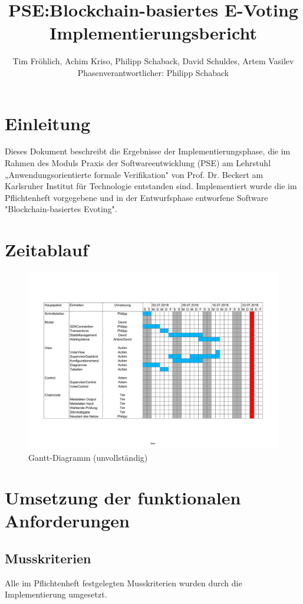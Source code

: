 \documentclass[parskip=full]{scrartcl}
\title{
	PSE:Blockchain-basiertes E-Voting \\
	Implementierungsbericht
}
\author{Tim Fröhlich, Achim Kriso, Philipp Schaback, David Schuldes, Artem Vasilev\\ Phasenverantwortlicher: Philipp Schaback}
\begin{document}
\clearpage
\maketitle
{}
\newpage

\tableofcontents
\newpage
{}

\section{Einleitung}
Dieses Dokument beschreibt die Ergebnisse der Implementierungsphase, die
im Rahmen des Moduls Praxis der Softwareentwicklung (PSE) am Lehrstuhl „Anwendungsorientierte formale Verifikation" von Prof. Dr. Beckert am Karlsruher Institut für
Technologie entstanden sind.
Implementiert wurde die im Pflichtenheft vorgegebene und in der Entwurfsphase entworfene Software "Blockchain-basiertes Evoting".


\section{Zeitablauf}
\begin{figure}[h!]
	\centering\includegraphics[width=\textwidth]{pictures/Gantt.pdf}
	\caption{Gantt-Diagramm (unvollständig)}
	\label{fig:gantt}
\end{figure}


\section{Umsetzung der funktionalen Anforderungen}

\subsection{Musskriterien}
Alle im Pflichtenheft festgelegten Musskriterien wurden durch die Implementierung umgesetzt.
\end{document}
